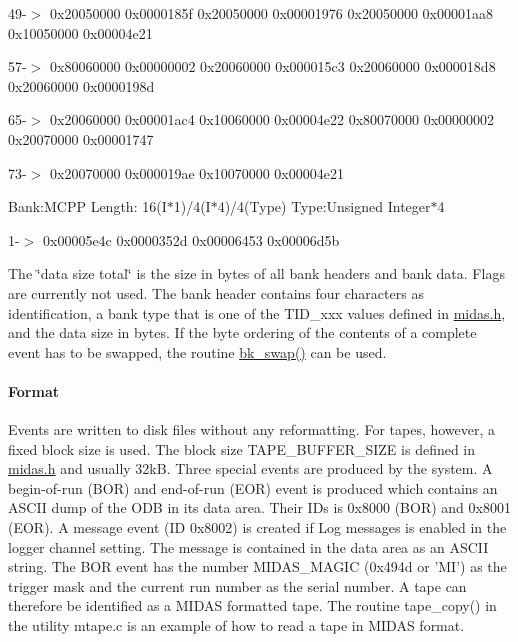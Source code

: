  49-\/$>$ 0x20050000 0x0000185f 0x20050000 0x00001976 0x20050000 0x00001aa8 0x10050000 0x00004e21\par
 57-\/$>$ 0x80060000 0x00000002 0x20060000 0x000015c3 0x20060000 0x000018d8 0x20060000 0x0000198d\par
 65-\/$>$ 0x20060000 0x00001ac4 0x10060000 0x00004e22 0x80070000 0x00000002 0x20070000 0x00001747\par
 73-\/$>$ 0x20070000 0x000019ae 0x10070000 0x00004e21\par
 \par
 Bank:MCPP Length: 16(I$\ast$1)/4(I$\ast$4)/4(Type) Type:Unsigned Integer$\ast$4\par
  1-\/$>$ 0x00005e4c 0x0000352d 0x00006453 0x00006d5b\par
 \par


The \char`\"{}data size total\char`\"{} is the size in bytes of all bank headers and bank data. Flags are currently not used. The bank header contains four characters as identification, a bank type that is one of the TID\_\-xxx values defined in \hyperlink{midas_8h}{midas.h}, and the data size in bytes. If the byte ordering of the contents of a complete event has to be swapped, the routine \hyperlink{group__bkfunctionc_ga44b7381af9b91fbdf2f6d59f55451ea1}{bk\_\-swap()} can be used.

\par


\par
 \label{FE_Data_format_idx_format_Midas_Tape}
\hypertarget{FE_Data_format_idx_format_Midas_Tape}{}
 \hypertarget{FE_Data_format_Tape}{}\paragraph{Format}\label{FE_Data_format_Tape}
Events are written to disk files without any reformatting. For tapes, however, a fixed block size is used. The block size TAPE\_\-BUFFER\_\-SIZE is defined in \hyperlink{midas_8h}{midas.h} and usually 32kB. Three special events are produced by the system. A begin-\/of-\/run (BOR) and end-\/of-\/run (EOR) event is produced which contains an ASCII dump of the ODB in its data area. Their IDs is 0x8000 (BOR) and 0x8001 (EOR). A message event (ID 0x8002) is created if Log messages is enabled in the logger channel setting. The message is contained in the data area as an ASCII string. The BOR event has the number MIDAS\_\-MAGIC (0x494d or 'MI') as the trigger mask and the current run number as the serial number. A tape can therefore be identified as a MIDAS formatted tape. The routine tape\_\-copy() in the utility mtape.c is an example of how to read a tape in MIDAS format.

